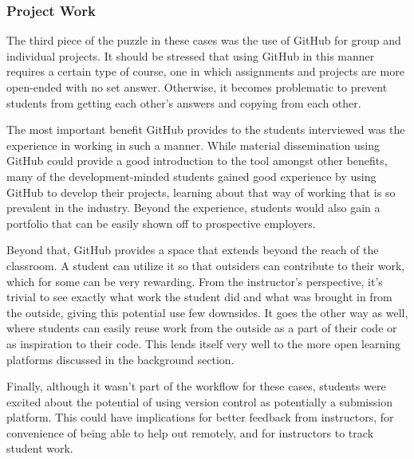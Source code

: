 
\subsubsection{Project Work}
The third piece of the puzzle in these cases was the use of GitHub for group and individual projects. It should be stressed that using GitHub in this manner requires a certain type of course, one in which assignments and projects are more open-ended with no set answer. Otherwise, it becomes problematic to prevent students from getting each other's answers and copying from each other.

The most important benefit GitHub provides to the students interviewed was the experience in working in such a manner. While material dissemination using GitHub could provide a good introduction to the tool amongst other benefits, many of the development-minded students gained good experience by using GitHub to develop their projects, learning about that way of working that is so prevalent in the industry. Beyond the experience, students would also gain a portfolio that can be easily shown off to prospective employers.

Beyond that, GitHub provides a space that extends beyond the reach of the classroom. A student can utilize it so that outsiders can contribute to their work, which for some can be very rewarding. From the instructor's perspective, it's trivial to see exactly what work the student did and what was brought in from the outside, giving this potential use few downsides. It goes the other way as well, where students can easily reuse work from the outside as a part of their code or as inspiration to their code. This lends itself very well to the more open learning platforms discussed in the background section. %

Finally, although it wasn't part of the workflow for these cases, students were excited about the potential of using version control as potentially a submission platform. This could have implications for better feedback from instructors, for convenience of being able to help out remotely, and for instructors to track student work.
